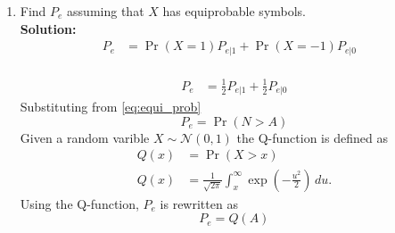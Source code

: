\documentclass{article}
\numberwithin{equation}{subsection}
\numberwithin{figure}{subsection}
\providecommand{\pr}[1]{\ensuremath{\Pr\left(#1\right)}}
\providecommand{\gauss}[2]{\mathcal{N}\ensuremath{\left(#1,#2\right)}}
\newcommand{\solution}{\noindent \textbf{Solution: }}
\renewcommand\thesection{\arabic{section}}
\renewcommand\thesubsection{\thesection.\arabic{subsection}}
\begin{document}
\begin{enumerate}[label=\thesubsection.\arabic*,ref=\thesubsection.\arabic{figure}]
\begin{equation}
\end{equation}
and 
\begin{equation}
	P_{e|1} = \pr{\hat{X} = 1|X=-1}
\end{equation}\\
\solution From above problem solution \eqref{eq:decision1}\\
\begin{align*}
P_{e|0} = \pr{\hat{X} = -1|X=1}\\
   = \pr{Y<0|X=1}\\
   = \pr{AX+N<0|X=1}\\
   = \pr{A+N<0}\\
    =\pr{N<-A}   
\end{align*}
\begin{align*}
P_{e|1} = \pr{\hat{X} = 1|X=-1}\\
   = \pr{Y>0|X=-1}\\
   = \pr{AX+N>0|X=-1}\\
   = \pr{-A+N>0}\\
    =\pr{N>A}   
\end{align*}
where,$N \sim \gauss{0}{1}$\\
\begin{align}
 \therefore \pr{N>A}=\pr{N<-A}\\
 P_{e|0}=P_{e|1} \label{eq:equi_prob}
\end{align}
 \item Find $P_e$ assuming that $X$ has equiprobable symbols.\\
 \solution \begin{align}
	P_e &= \pr{X=1}P_{e|1} + \pr{X=-1}P_{e|0}& \label{eq:Pe_of_X}
	\end{align}
	\\
	\begin{align}
	P_e &= \frac{1}{2}P_{e|1} + \frac{1}{2}P_{e|0}
\end{align}
Substituting from \eqref{eq:equi_prob}
\begin{equation}
	P_e = \pr{N > A}
\end{equation}
Given a random varible $X \sim \gauss{0}{1}$ the Q-function is defined as
\begin{align}
	Q(x) &= \pr{X > x}\\
	\label{eq:q_func_integral}
	Q(x) &= \frac{1}{\sqrt{2\pi}} \int_x^\infty \exp\left(-\frac{u^2}{2}\right) \, du.
\end{align}
Using the Q-function, $P_e$ is rewritten as
\begin{equation}
	P_e = Q(A)
\end{equation} 

\end{enumerate}
\end{document}
